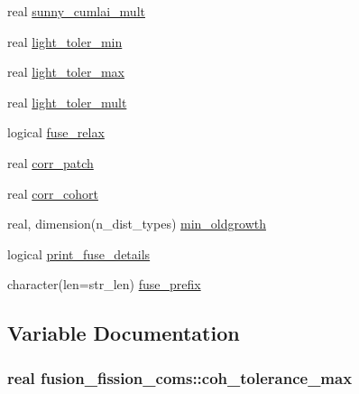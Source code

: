 \begin{DoxyCompactItemize}
\item 
real \hyperlink{namespacefusion__fission__coms_a75dd3af0dafb1c866f6b29f647227a79}{sunny\+\_\+cumlai\+\_\+mult}
\item 
real \hyperlink{namespacefusion__fission__coms_a18de7d0363e629bf717866e1be6d6784}{light\+\_\+toler\+\_\+min}
\item 
real \hyperlink{namespacefusion__fission__coms_a35ae334e26d06d11e6d7373a538694b9}{light\+\_\+toler\+\_\+max}
\item 
real \hyperlink{namespacefusion__fission__coms_aa0ffb9883c43635481ab9abb79b66de3}{light\+\_\+toler\+\_\+mult}
\item 
logical \hyperlink{namespacefusion__fission__coms_ae3996cd91b27f9b130517df7870d5869}{fuse\+\_\+relax}
\item 
real \hyperlink{namespacefusion__fission__coms_aa480a4503cfdfdbfc8c76fa5570672d1}{corr\+\_\+patch}
\item 
real \hyperlink{namespacefusion__fission__coms_ae94ecd34b091879520d758e554ec9efc}{corr\+\_\+cohort}
\item 
real, dimension(n\+\_\+dist\+\_\+types) \hyperlink{namespacefusion__fission__coms_a9cf3e613ab7d8869809784220ab99b1b}{min\+\_\+oldgrowth}
\item 
logical \hyperlink{namespacefusion__fission__coms_afaa756efb130d43d617b625105e6efc3}{print\+\_\+fuse\+\_\+details}
\item 
character(len=str\+\_\+len) \hyperlink{namespacefusion__fission__coms_a459ec82605ae0362d2556be00084a964}{fuse\+\_\+prefix}
\end{DoxyCompactItemize}


\subsection{Variable Documentation}
\subsubsection[{\texorpdfstring{coh\+\_\+tolerance\+\_\+max}{coh_tolerance_max}}]{\setlength{\rightskip}{0pt plus 5cm}real fusion\+\_\+fission\+\_\+coms\+::coh\+\_\+tolerance\+\_\+max}\hypertarget{namespacefusion__fission__coms_a26b067f4070a314e0e5d2c52088aa6d9}{}\label{namespacefusion__fission__coms_a26b067f4070a314e0e5d2c52088aa6d9}
